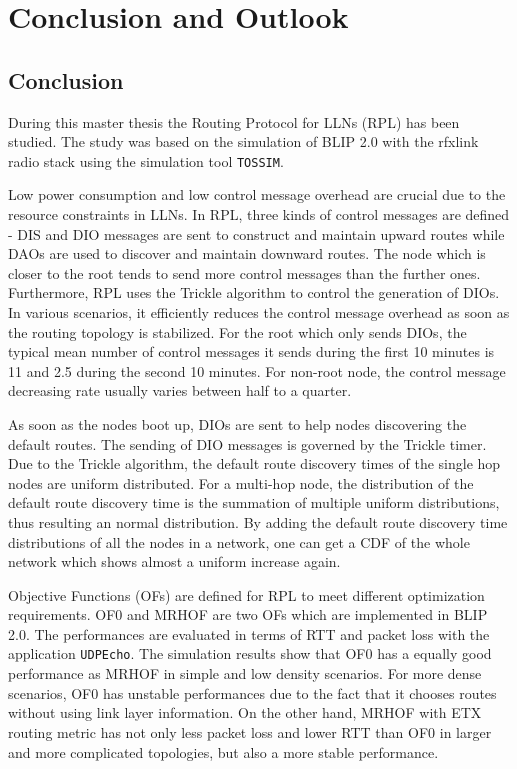 \chapter{Conclusion and Outlook}
\label{Con}
\section{Conclusion}
\label{Con:Con}

During this master thesis the Routing Protocol for LLNs (RPL) has been studied. The study was based on the simulation of BLIP 2.0 with the rfxlink radio stack using the simulation tool \texttt{TOSSIM}.

Low power consumption and low control message overhead are crucial due to the resource constraints in LLNs. In RPL, three kinds of control messages are defined - DIS and DIO messages are sent to construct and maintain upward routes while DAOs are used to discover and maintain downward routes. The node which is closer to the root tends to send more control messages than the further ones. Furthermore, RPL uses the Trickle algorithm to control the generation of DIOs. In various scenarios, it efficiently reduces the control message overhead as soon as the routing topology is stabilized. For the root which only sends DIOs, the typical mean number of control messages it sends during the first 10 minutes is 11 and 2.5 during the second 10 minutes. For non-root node, the control message decreasing rate usually varies between half to a quarter.

As soon as the nodes boot up, DIOs are sent to help nodes discovering the default routes. The sending of DIO messages is governed by the Trickle timer. Due to the Trickle algorithm, the default route discovery times of the single hop nodes are uniform distributed. For a multi-hop node, the distribution of the default route discovery time is the summation of multiple uniform distributions, thus resulting an normal distribution. By adding the default route discovery time distributions of all the nodes in a network, one can get a CDF of the whole network which shows almost a uniform increase again.


Objective Functions (OFs) are defined for RPL to meet different optimization requirements. OF0 and MRHOF are two OFs which are implemented in BLIP 2.0. The performances are evaluated in terms of RTT and packet loss with the application \texttt{UDPEcho}. The simulation results show that OF0 has a equally good performance as MRHOF in simple and low density scenarios. For more dense scenarios, OF0 has unstable performances due to the fact that it chooses routes without using link layer information. On the other hand, MRHOF with ETX routing metric has not only less packet loss and lower RTT than OF0 in larger and more complicated topologies, but also a more stable performance.

